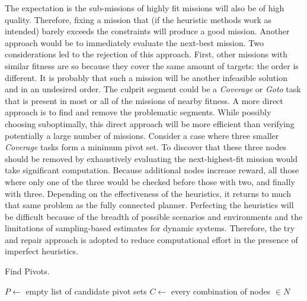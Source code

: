 \documentclass{tamuccthesis}
\begin{document}
The expectation is the sub-missions of highly fit missions will also be of high quality. Therefore, fixing a mission that (if the heuristic methods work as intended) barely exceeds the constraints will produce a good mission. Another approach would be to immediately evaluate the next-best mission. Two considerations led to the rejection of this approach. First, other missions with similar fitness are so because they cover the same amount of targets: the order is different. It is probably that such a mission will be another infeasible solution and in an undesired order. The culprit segment could be a \textit{Coverage} or \textit{Goto} task that is present in most or all of the missions of nearby fitness. A more direct approach is to find and remove the problematic segments. While possibly choosing suboptimally, this direct approach will be more efficient than verifying potentially a large number of missions. Consider a case where three smaller \textit{Coverage} tasks form a minimum pivot set. To discover that these three nodes should be removed by exhaustively evaluating the next-highest-fit mission would take significant computation. Because additional nodes increase reward, all those where only one of the three would be checked before those with two, and finally with three. Depending on the effectiveness of the heuristics, it returns to much that same problem as the fully connected planner. Perfecting the heuristics will be difficult because of the breadth of possible scenarios and environments and the limitations of sampling-based estimates for dynamic systems. Therefore, the try and repair approach is adopted to reduce computational effort in the presence of imperfect heuristics. 



\begin{spacing}{0.5}
\begin{algorithm}[H]
\caption[Find Pivots.]{Find Pivots.}
\label{alg:find_pivots}
$P \leftarrow$ empty list of candidate pivot sets\;
$C \leftarrow$ every combination of nodes $\in N$\;
\end{algorithm}
\end{spacing}
\end{document}
